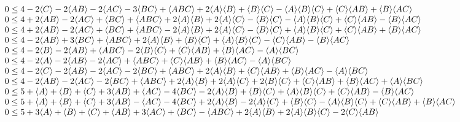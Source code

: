 {\begin{align*}
\begin{array}{l}
 0
\leq
{4 -2 \expec{C} -2 \expec{A B} -2 \expec{A C} -3 \expec{B C} + \expec{A B C} + 2 \expec{A} \expec{B} + \expec{B} \expec{C} -\expec{A} \expec{B} \expec{C} + \expec{C} \expec{A B} + \expec{B} \expec{A C}} \\
 0
\leq
{4 + 2 \expec{A B} -2 \expec{A C} + \expec{B C} + \expec{A B C} + 2 \expec{A} \expec{B} + 2 \expec{A} \expec{C} -\expec{B} \expec{C} -\expec{A} \expec{B} \expec{C} + \expec{C} \expec{A B} -\expec{B} \expec{A
   C}} \\
 0
\leq
{4 + 2 \expec{A B} -2 \expec{A C} + \expec{B C} + \expec{A B C} -2 \expec{A} \expec{B} + 2 \expec{A} \expec{C} -\expec{B} \expec{C} + \expec{A} \expec{B} \expec{C} + \expec{C} \expec{A B} + \expec{B} \expec{A C}}
   \\
 0
\leq
{4 -2 \expec{A B} + 3 \expec{B C} + \expec{A B C} + 2 \expec{A} \expec{B} + \expec{B} \expec{C} + \expec{A} \expec{B} \expec{C} -\expec{C} \expec{A B} -\expec{B} \expec{A C}} \\
 0
\leq
{4 -2 \expec{B} -2 \expec{A B} + \expec{A B C} -2 \expec{B} \expec{C} + \expec{C} \expec{A B} + \expec{B} \expec{A C} -\expec{A} \expec{B C}} \\
 0
\leq
{4 -2 \expec{A} -2 \expec{A B} -2 \expec{A C} + \expec{A B C} + \expec{C} \expec{A B} + \expec{B} \expec{A C} -\expec{A} \expec{B C}} \\
 0
\leq
{4 -2 \expec{C} -2 \expec{A B} -2 \expec{A C} -2 \expec{B C} + \expec{A B C} + 2 \expec{A} \expec{B} + \expec{C} \expec{A B} + \expec{B} \expec{A C} -\expec{A} \expec{B C}} \\
 0
\leq
{4 -2 \expec{A B} -2 \expec{A C} -2 \expec{B C} + \expec{A B C} + 2 \expec{A} \expec{B} + 2 \expec{A} \expec{C} + 2 \expec{B} \expec{C} + \expec{C} \expec{A B} + \expec{B} \expec{A C} + \expec{A} \expec{B C}} \\
 0
\leq
{5 + \expec{A} + \expec{B} + \expec{C} + 3 \expec{A B} + \expec{A C} -4 \expec{B C} -2 \expec{A} \expec{B} + \expec{B} \expec{C} + \expec{A} \expec{B} \expec{C} + \expec{C} \expec{A B} -\expec{B} \expec{A C}} \\
 0
\leq
{5 + \expec{A} + \expec{B} + \expec{C} + 3 \expec{A B} -\expec{A C} -4 \expec{B C} + 2 \expec{A} \expec{B} -2 \expec{A} \expec{C} + \expec{B} \expec{C} -\expec{A} \expec{B} \expec{C} + \expec{C} \expec{A B} +
   \expec{B} \expec{A C}} \\
 0
\leq
{5 + 3 \expec{A} + \expec{B} + \expec{C} + \expec{A B} + 3 \expec{A C} + \expec{B C} -\expec{A B C} + 2 \expec{A} \expec{B} + 2 \expec{A} \expec{B} \expec{C} -2 \expec{C} \expec{A B}} \\

\end{array}
\end{align*}}
